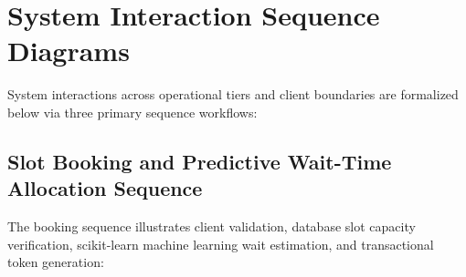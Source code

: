 \newpage
\section{System Interaction Sequence Diagrams}

System interactions across operational tiers and client boundaries are formalized below via three primary sequence workflows:

\subsection{Slot Booking and Predictive Wait-Time Allocation Sequence}

The booking sequence illustrates client validation, database slot capacity verification, scikit-learn machine learning wait estimation, and transactional token generation:

